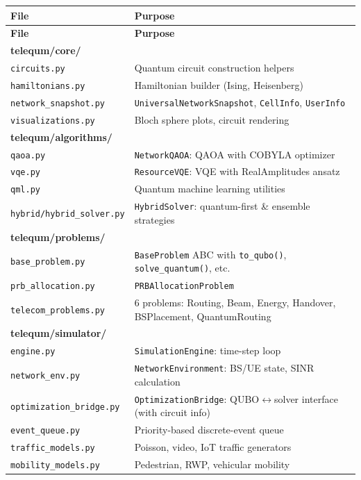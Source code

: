 \documentclass[11pt,a4paper]{article}
\begin{document}
\begin{longtable}{lp{8cm}}
\toprule
\textbf{File} & \textbf{Purpose} \\
\midrule
\endfirsthead
\toprule
\textbf{File} & \textbf{Purpose} \\
\midrule
\endhead

\multicolumn{2}{l}{\textbf{telequm/core/}} \\
\texttt{circuits.py} & Quantum circuit construction helpers \\
\texttt{hamiltonians.py} & Hamiltonian builder (Ising, Heisenberg) \\
\texttt{network\_snapshot.py} & \texttt{UniversalNetworkSnapshot}, \texttt{CellInfo}, \texttt{UserInfo} \\
\texttt{visualizations.py} & Bloch sphere plots, circuit rendering \\
\midrule

\multicolumn{2}{l}{\textbf{telequm/algorithms/}} \\
\texttt{qaoa.py} & \texttt{NetworkQAOA}: QAOA with COBYLA optimizer \\
\texttt{vqe.py} & \texttt{ResourceVQE}: VQE with RealAmplitudes ansatz \\
\texttt{qml.py} & Quantum machine learning utilities \\
\texttt{hybrid/hybrid\_solver.py} & \texttt{HybridSolver}: quantum-first \& ensemble strategies \\
\midrule

\multicolumn{2}{l}{\textbf{telequm/problems/}} \\
\texttt{base\_problem.py} & \texttt{BaseProblem} ABC with \texttt{to\_qubo()}, \texttt{solve\_quantum()}, etc. \\
\texttt{prb\_allocation.py} & \texttt{PRBAllocationProblem} \\
\texttt{telecom\_problems.py} & 6 problems: Routing, Beam, Energy, Handover, BSPlacement, QuantumRouting \\
\midrule

\multicolumn{2}{l}{\textbf{telequm/simulator/}} \\
\texttt{engine.py} & \texttt{SimulationEngine}: time-step loop \\
\texttt{network\_env.py} & \texttt{NetworkEnvironment}: BS/UE state, SINR calculation \\
\texttt{optimization\_bridge.py} & \texttt{OptimizationBridge}: QUBO$\leftrightarrow$solver interface (with circuit info) \\
\texttt{event\_queue.py} & Priority-based discrete-event queue \\
\texttt{traffic\_models.py} & Poisson, video, IoT traffic generators \\
\texttt{mobility\_models.py} & Pedestrian, RWP, vehicular mobility \\
\midrule


\end{longtable}
\end{document}
